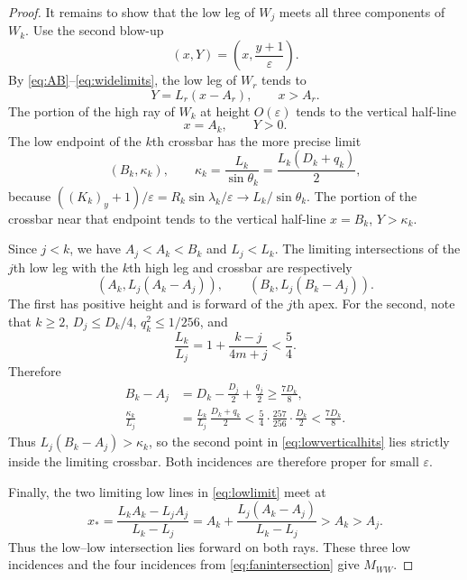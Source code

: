 \documentclass[11pt]{amsart}
\theoremstyle{definition}
\newcommand{\eps}{\varepsilon}
\begin{document}
\begin{proof}
It remains to show that the low leg of $W_j$ meets all three components of
$W_k$.  Use the second blow-up
\[
 (x,Y)=\left(x,\frac{y+1}{\eps}\right).
\]
By \eqref{eq:AB}--\eqref{eq:widelimits}, the low leg of $W_r$ tends to
\begin{equation}\label{eq:lowlimit}
 Y=L_r(x-A_r),\qquad x>A_r.
\end{equation}
The portion of the high ray of $W_k$ at height $O(\eps)$ tends to the
vertical half-line
\[
 x=A_k,\qquad Y>0.
\]
The low endpoint of the $k$th crossbar has the more precise limit
\begin{equation}\label{eq:lowendpointheight}
 \left(B_k,\kappa_k\right),
 \qquad
 \kappa_k=\frac{L_k}{\sin\theta_k}
          =\frac{L_k(D_k+q_k)}{2},
\end{equation}
because $((K_k)_y+1)/\eps=R_k\sin\lambda_k/\eps\to
L_k/\sin\theta_k$.  The portion of the crossbar near that endpoint tends
to the vertical half-line $x=B_k$, $Y>\kappa_k$.

Since $j<k$, we have $A_j<A_k<B_k$ and $L_j<L_k$.  The limiting
intersections of the $j$th low leg with the $k$th high leg and crossbar are
respectively
\begin{equation}\label{eq:lowverticalhits}
 (A_k,L_j(A_k-A_j)),
 \qquad
 (B_k,L_j(B_k-A_j)).
\end{equation}
The first has positive height and is forward of the $j$th apex.  For the
second, note that $k\ge2$, $D_j\le D_k/4$, $q_k^2\le1/256$, and
\[
 \frac{L_k}{L_j}
 =1+\frac{k-j}{4m+j}<\frac54.
\]
Therefore
\begin{align*}
 B_k-A_j
 &=D_k-\frac{D_j}{2}+\frac{q_j}{2}
   \ge\frac{7D_k}{8},\\
 \frac{\kappa_k}{L_j}
 &=\frac{L_k}{L_j}\,\frac{D_k+q_k}{2}
 <\frac54\cdot\frac{257}{256}\cdot\frac{D_k}{2}
 <\frac{7D_k}{8}.
\end{align*}
Thus $L_j(B_k-A_j)>\kappa_k$, so the second point in
\eqref{eq:lowverticalhits} lies strictly inside the limiting crossbar.
Both incidences are therefore proper for small $\eps$.

Finally, the two limiting low lines in \eqref{eq:lowlimit} meet at
\begin{equation}\label{eq:lowlowx}
 x_*=
 \frac{L_kA_k-L_jA_j}{L_k-L_j}
 =A_k+\frac{L_j(A_k-A_j)}{L_k-L_j}>A_k>A_j.
\end{equation}
Thus the low--low intersection lies forward on both rays.  These three low
incidences and the four incidences from \eqref{eq:fanintersection} give
$M_{WW}$.
\end{proof}
\end{document}
